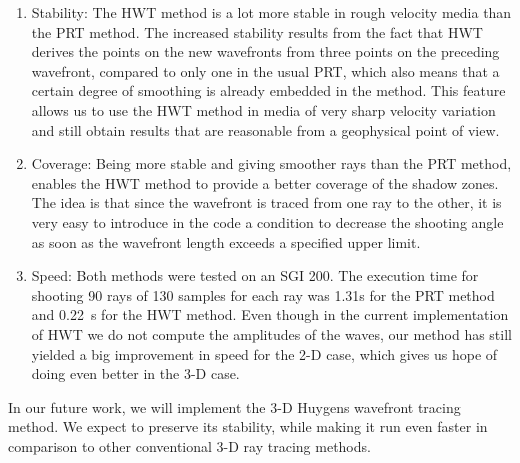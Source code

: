 \begin{enumerate}
\item  Stability: The HWT method is a lot more stable in rough
velocity media than the PRT method. The increased stability results
from the fact that HWT derives the points on the new wavefronts from 
three points on the preceding wavefront, compared to only one in the
usual PRT, which also means that a certain degree of smoothing is already
embedded in the method. This feature allows us to use the HWT
method in media of very sharp velocity variation and still
obtain results that are reasonable from a geophysical point of view.

\item  Coverage: Being more stable and giving smoother rays than the PRT
method, enables the HWT method to provide a better coverage of
the shadow zones. The idea is that since the wavefront is traced from one
ray to the other, it is very easy to introduce in the code a condition
to decrease the shooting angle as soon as the wavefront length exceeds
a specified upper limit.

\item Speed: Both methods were tested on an SGI 200. The execution time
for shooting 90 rays of 130 samples for each ray was 1.31s for the PRT method
and \mbox{0.22 s} for the HWT method. Even though in the current implementation
of HWT we do not compute the amplitudes of the waves, our method has
still yielded a big improvement in speed for the 2-D case, which gives us
hope of doing even better in the 3-D case. 
\end{enumerate}
\par
In our future work, we will implement the 3-D Huygens wavefront tracing
method. We expect to preserve its stability, while making it run even
faster in comparison to other conventional 3-D ray tracing methods.


 



%
%
